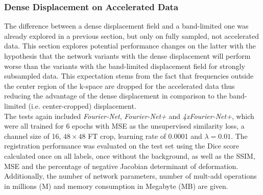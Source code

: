 \subsubsection{Dense Displacement on Accelerated Data} \label{SubSubSec:DenseDisplacementAcc}
The difference between a dense displacement field and a band-limited one was already explored in a previous section, but only on fully sampled, not accelerated data. This section explores potential performance changes on the latter with the hypothesis that the network variants with the dense displacement will perform worse than the variants with the band-limited displacement field for strongly subsampled data. This expectation stems from the fact that frequencies outside the center region of the k-space are dropped for the accelerated data thus reducing the advantage of the dense displacement in comparison to the band-limited (i.e. center-cropped) displacement. \\
The tests again included \emph{Fourier-Net}, \emph{Fourier-Net+} and \emph{4xFourier-Net+}, which were all trained for 6 epochs with MSE as the unsupervised similarity loss, a channel size of 16, $48 \times 48$ FT crop, learning rate of 0.0001 and $\lambda=0.01$. The registration performance was evaluated on the test set using the Dice score calculated once on all labels, once without the background, as well as the SSIM, MSE and the percentage of negative Jacobian determinant of deformation. Additionally, the number of network parameters, number of mult-add operations in millions (M) and memory consumption in Megabyte (MB) are given.

